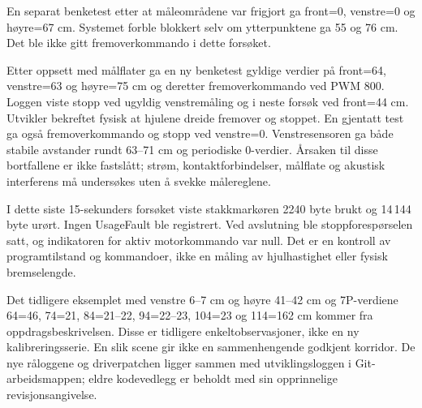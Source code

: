En separat benketest etter at måleområdene var frigjort ga front=0,
venstre=0 og høyre=67 cm. Systemet forble blokkert selv om ytterpunktene
ga 55 og 76 cm. Det ble ikke gitt fremoverkommando i dette forsøket.

Etter oppsett med målflater ga en ny benketest gyldige verdier på
front=64, venstre=63 og høyre=75 cm og deretter fremoverkommando ved
PWM 800. Loggen viste stopp ved ugyldig venstremåling og i neste
forsøk ved front=44 cm. Utvikler bekreftet fysisk at hjulene dreide
fremover og stoppet. En gjentatt test ga også fremoverkommando og stopp ved venstre=0.
Venstresensoren ga både stabile avstander rundt
63--71 cm og periodiske 0-verdier. Årsaken til disse bortfallene er
ikke fastslått; strøm, kontaktforbindelser, målflate og akustisk
interferens må undersøkes uten å svekke målereglene.

I dette siste 15-sekunders forsøket viste stakkmarkøren 2240 byte
brukt og 14\,144 byte urørt. Ingen UsageFault ble registrert. Ved
avslutning ble stoppforespørselen satt, og indikatoren for aktiv
motorkommando var null. Det er en kontroll av programtilstand og
kommandoer, ikke en måling av hjulhastighet eller fysisk bremselengde.

Det tidligere eksemplet med venstre 6--7 cm og høyre 41--42 cm og
7P-verdiene 64\textdegree{}=46, 74\textdegree{}=21,
84\textdegree{}=21--22, 94\textdegree{}=22--23,
104\textdegree{}=23 og 114\textdegree{}=162 cm kommer fra
oppdragsbeskrivelsen. Disse er tidligere enkeltobservasjoner, ikke en
ny kalibreringsserie. En slik scene gir ikke en sammenhengende godkjent
korridor. De nye råloggene og driverpatchen ligger sammen med
utviklingsloggen i Git-arbeidsmappen; eldre kodevedlegg er beholdt med
sin opprinnelige revisjonsangivelse.
